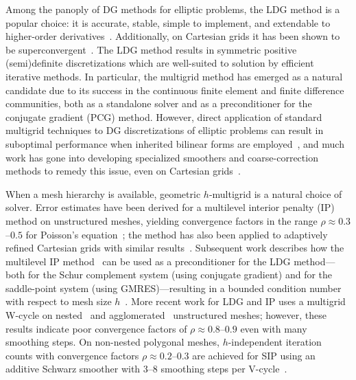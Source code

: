 Among the panoply of DG methods for elliptic problems, the LDG method is a popular choice: it is accurate, stable, simple to implement, and extendable to higher-order derivatives~\cite{Yan_02_01}. Additionally, on Cartesian grids it has been shown to be superconvergent~\cite{Cockburn_01_01}. The LDG method results in symmetric positive (semi)definite discretizations which are well-suited to solution by efficient iterative methods. In particular, the multigrid method has emerged as a natural candidate due to its success in the continuous finite element and finite difference communities, both as a standalone solver and as a preconditioner for the conjugate gradient (PCG) method. However, direct application of standard multigrid techniques to DG discretizations of elliptic problems can result in suboptimal performance when inherited bilinear forms are employed~\cite{Antonietti_15_01, Gopalakrishnan_03_01}, and much work has gone into developing specialized smoothers and coarse-correction methods to remedy this issue, even on Cartesian grids~\cite{Kanschat_03_01, Fabien_19_01}.

When a mesh hierarchy is available, geometric $h$-multigrid is a natural choice of solver. Error estimates have been derived for a multilevel interior penalty (IP) method on unstructured meshes, yielding convergence factors in the range $\rho \approx 0.3$--$0.5$ for Poisson's equation~\cite{Gopalakrishnan_03_01, Brenner_05_01}; the method has also been applied to adaptively refined Cartesian grids with similar results~\cite{Kanschat_04_01}. Subsequent work describes how the multilevel IP method~\cite{Gopalakrishnan_03_01} can be used as a preconditioner for the LDG method---both for the Schur complement system (using conjugate gradient) and for the saddle-point system (using GMRES)---resulting in a bounded condition number with respect to mesh size $h$~\cite{Kanschat_03_01}. More recent work for LDG and IP uses a multigrid W-cycle on nested~\cite{Antonietti_15_01} and agglomerated~\cite{Antonietti_17_01} unstructured meshes; however, these results indicate poor convergence factors of $\rho \approx 0.8$--$0.9$ even with many smoothing steps. On non-nested polygonal meshes, $h$-independent iteration counts with convergence factors $\rho \approx 0.2$--$0.3$ are achieved for SIP using an additive Schwarz smoother with 3--8 smoothing steps per V-cycle~\cite{Antonietti_19_01}.

